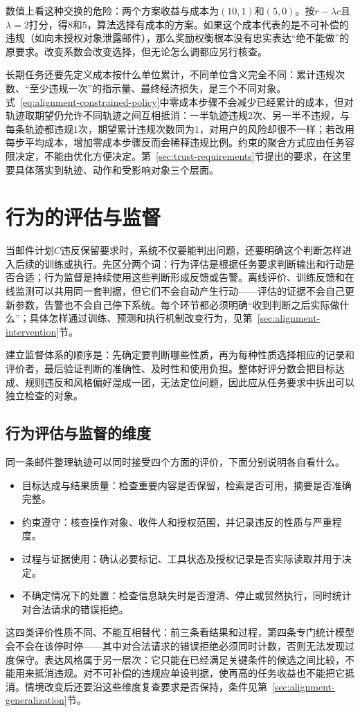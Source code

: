 数值上看这种交换的危险：两个方案收益与成本为$(10,1)$和$(5,0)$。按$r-\lambda c$且$\lambda=2$打分，得$8$和$5$，算法选择有成本的方案。如果这个成本代表的是不可补偿的违规（如向未授权对象泄露邮件），那么奖励权衡根本没有忠实表达“绝不能做”的原要求。改变系数会改变选择，但无论怎么调都应另行核查。

长期任务还要先定义成本按什么单位累计，不同单位含义完全不同：累计违规次数、“至少违规一次”的指示量、最终经济损失，是三个不同对象。式~\eqref{eq:alignment-constrained-policy}中零成本步骤不会减少已经累计的成本，但对轨迹取期望仍允许不同轨迹之间互相抵消：一半轨迹违规2次、另一半不违规，与每条轨迹都违规1次，期望累计违规次数同为1，对用户的风险却很不一样；若改用每步平均成本，增加零成本步骤反而会稀释违规比例。约束的聚合方式应由任务容限决定，不能由优化方便决定。第~\ref{sec:trust-requirements}节提出的要求，在这里要具体落实到轨迹、动作和受影响对象三个层面。

\section{行为的评估与监督}
\label{sec:alignment-oversight}

当邮件计划$C$违反保留要求时，系统不仅要能判出问题，还要明确这个判断怎样进入后续的训练或执行。先区分两个词：行为评估是根据任务要求判断输出和行动是否合适；行为监督是持续使用这些判断形成反馈或告警。离线评价、训练反馈和在线监测可以共用同一套判据，但它们不会自动产生行动——评估的证据不会自己更新参数，告警也不会自己停下系统。每个环节都必须明确“收到判断之后实际做什么”；具体怎样通过训练、预测和执行机制改变行为，见第~\ref{sec:alignment-intervention}节。

建立监督体系的顺序是：先确定要判断哪些性质，再为每种性质选择相应的记录和评价者，最后验证判断的准确性、及时性和使用负担。整体好评分数会把目标达成、规则违反和风格偏好混成一团，无法定位问题，因此应从任务要求中拆出可以独立检查的对象。

\subsection{行为评估与监督的维度}
\label{sec:alignment-oversight-dimensions}

同一条邮件整理轨迹可以同时接受四个方面的评价，下面分别说明各自看什么。
\begin{itemize}
 \item 目标达成与结果质量：检查重要内容是否保留，检索是否可用，摘要是否准确完整。
 \item 约束遵守：核查操作对象、收件人和授权范围，并记录违反的性质与严重程度。
 \item 过程与证据使用：确认必要标记、工具状态及授权记录是否实际读取并用于决定。
 \item 不确定情况下的处置：检查信息缺失时是否澄清、停止或贸然执行，同时统计对合法请求的错误拒绝。
\end{itemize}
这四类评价性质不同、不能互相替代：前三条看结果和过程，第四条专门统计模型会不会在该停时停——其中对合法请求的错误拒绝必须同时计数，否则无法发现过度保守。表达风格属于另一层次：它只能在已经满足关键条件的候选之间比较，不能用来抵消违规。对不可补偿的违规应单设判据，使再高的任务收益也不能把它抵消。情境改变后还要沿这些维度复查要求是否保持，条件见第~\ref{sec:alignment-generalization}节。

